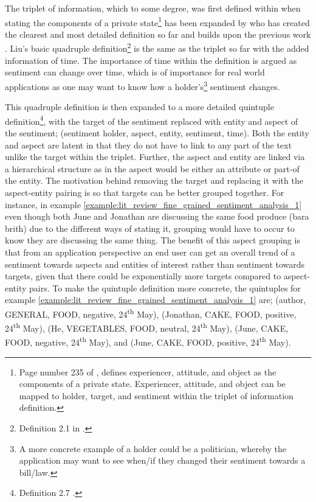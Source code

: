 The triplet of information, which to some degree, was first defined within \citet{wiebe-1994-tracking} when stating the components of a private state\footnote{Page number 235 of \citet{wiebe-1994-tracking}, defines experiencer, attitude, and object as the components of a private state. Experiencer, attitude, and object can be mapped to holder, target, and sentiment within the triplet of information definition.} has been expanded by \citet{liu2015sentiment} who has created the clearest and most detailed definition so far and builds upon the previous work \citep{wiebe-1994-tracking, kim-hovy-2004-determining, ding2008holistic}. Liu's \citep{liu2015sentiment} basic quadruple definition\footnote{Definition 2.1 in \citet{liu2015sentiment}.} is the same as the triplet so far with the added information of time. The importance of time within the definition is argued as sentiment can change over time, which is of importance for real world applications as one may want to know how a holder's\footnote{A more concrete example of a holder could be a politician, whereby the application may want to see when/if they changed their sentiment towards a bill/law.} sentiment changes. 

This quadruple definition is then expanded to a more detailed quintuple definition\footnote{Definition 2.7 \citet{liu2015sentiment}.}, with the target of the sentiment replaced with entity and aspect of the sentiment; (sentiment holder, aspect, entity, sentiment, time). Both the entity and aspect are latent in that they do not have to link to any part of the text unlike the target within the triplet. Further, the aspect and entity are linked via a hierarchical structure as in the aspect would be either an attribute or part-of the entity. The motivation behind removing the target and replacing it with the aspect-entity pairing is so that targets can be better grouped together. For instance, in example \ref{example:lit_review_fine_grained_sentiment_analysis_1} even though both June and Jonathan are discussing the same food produce (bara brith) due to the different ways of stating it, grouping would have to occur to know they are discussing the same thing. The benefit of this aspect grouping is that from an application perspective an end user can get an overall trend of a sentiment towards aspects and entities of interest rather than sentiment towards targets, given that there could be exponentially more targets compared to aspect-entity pairs. To make the quintuple definition more concrete, the quintuples for example \ref{example:lit_review_fine_grained_sentiment_analysis_1} are; (author, GENERAL, FOOD, negative, 24\textsuperscript{th} May), (Jonathan, CAKE, FOOD, positive, 24\textsuperscript{th} May), (He, VEGETABLES, FOOD, neutral, 24\textsuperscript{th} May), (June, CAKE, FOOD, negative, 24\textsuperscript{th} May), and (June, CAKE, FOOD, positive, 24\textsuperscript{th} May).

